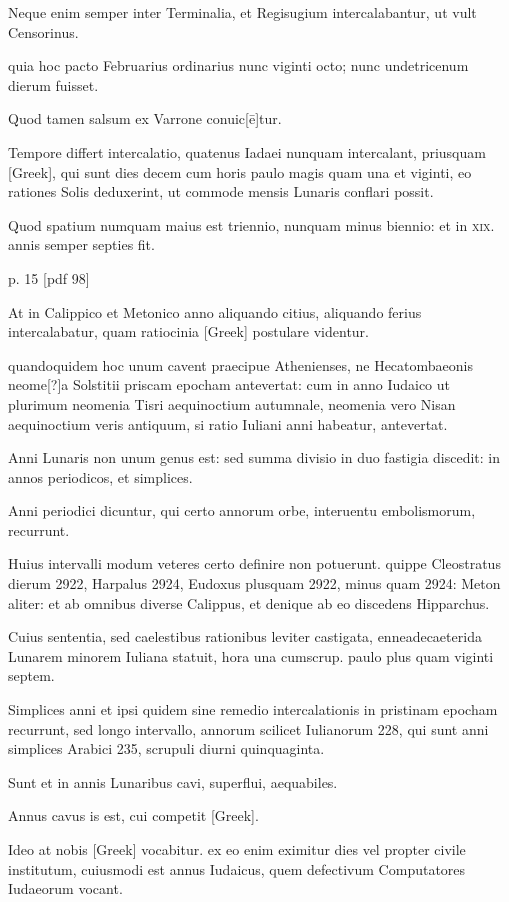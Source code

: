 Neque enim semper inter
Terminalia, et Regisugium intercalabantur, ut vult Censorinus.

quia hoc pacto Februarius ordinarius nunc viginti octo; nunc undetricenum
dierum fuisset.

Quod tamen salsum ex Varrone conuic[ē]tur.

Tempore differt intercalatio, quatenus Iadaei nunquam intercalant,
priusquam \textgreek{[Greek]}, qui sunt dies decem cum horis paulo
magis quam una et viginti, eo rationes Solis deduxerint, ut commode
mensis Lunaris conflari possit.

Quod spatium numquam maius est
triennio, nunquam minus biennio: et in \textsc{xix}. annis semper septies fit.


p. 15 [pdf 98]

At in Calippico et Metonico anno aliquando citius, aliquando ferius
intercalabatur, quam ratiocinia \textgreek{[Greek]} postulare videntur.

quandoquidem hoc unum cavent praecipue Athenienses, ne Hecatombaeonis
neome[?]a Solstitii priscam epocham antevertat: cum in
anno Iudaico ut plurimum neomenia Tisri aequinoctium autumnale,
neomenia vero Nisan aequinoctium veris antiquum, si ratio Iuliani
anni habeatur, antevertat.

Anni Lunaris non unum genus est: sed
summa divisio in duo fastigia discedit: in annos periodicos, et simplices.

Anni periodici dicuntur, qui certo annorum orbe, interuentu
embolismorum, recurrunt.

Huius intervalli modum veteres certo
definire non potuerunt. quippe Cleostratus dierum 2922, Harpalus
2924, Eudoxus plusquam 2922, minus quam 2924: Meton aliter:
et ab omnibus diverse Calippus, et denique ab eo discedens Hipparchus.

Cuius sententia, sed caelestibus rationibus leviter castigata, enneadecaeterida
Lunarem minorem Iuliana statuit, hora una cumscrup. paulo
plus quam viginti septem.

Simplices anni et ipsi quidem sine remedio
intercalationis in pristinam epocham recurrunt, sed longo intervallo,
annorum scilicet Iulianorum 228, qui sunt anni simplices Arabici 235,
scrupuli diurni quinquaginta.

Sunt et in annis Lunaribus cavi, superflui,
aequabiles.

Annus cavus is est, cui competit \textgreek{[Greek]}.

Ideo at nobis \textgreek{[Greek]} vocabitur. ex eo enim eximitur dies
vel propter civile institutum, cuiusmodi est annus Iudaicus,
quem defectivum
Computatores Iudaeorum vocant.

